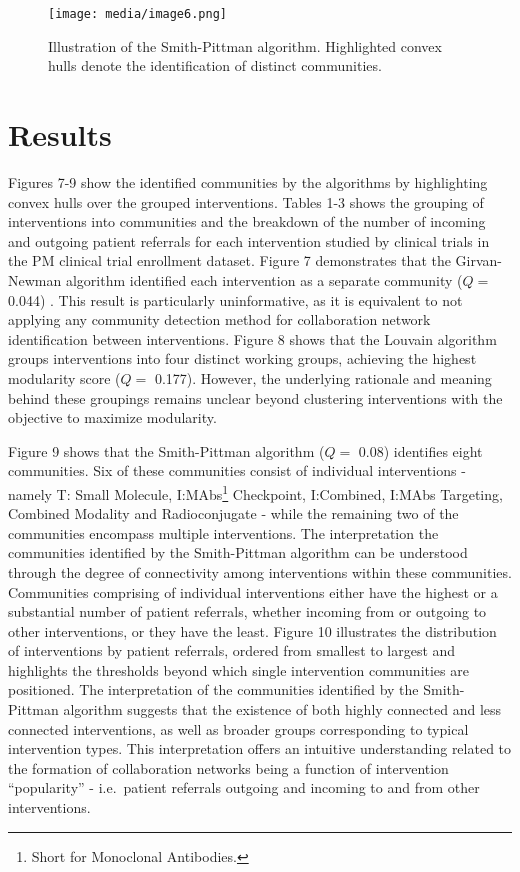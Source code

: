 \documentclass{article}
\begin{document}
\begin{figure}
\centering
\texttt{[image: media/image6.png]}
\caption{Illustration of the Smith-Pittman algorithm.
Highlighted convex hulls denote the identification of distinct
communities.}
\end{figure}

\section{Results}\label{results}

Figures 7-9 show the identified communities by the algorithms by
highlighting convex hulls over the grouped interventions. Tables 1-3
shows the grouping of interventions into communities and the breakdown
of the number of incoming and outgoing patient referrals for each
intervention studied by clinical trials in the PM clinical trial
enrollment dataset. Figure 7 demonstrates that the Girvan-Newman
algorithm identified each intervention as a separate community (\(Q =\)
0.044) . This result is particularly uninformative, as it is equivalent
to not applying any community detection method for collaboration network
identification between interventions. Figure 8 shows that the Louvain
algorithm groups interventions into four distinct working groups,
achieving the highest modularity score (\(Q =\) 0.177). However, the
underlying rationale and meaning behind these groupings remains unclear
beyond clustering interventions with the objective to maximize
modularity.

Figure 9 shows that the Smith-Pittman algorithm (\(Q =\) 0.08)
identifies eight communities. Six of these communities consist of
individual interventions - namely T: Small Molecule, I:MAbs\footnote{Short
  for Monoclonal Antibodies.} Checkpoint, I:Combined, I:MAbs Targeting,
Combined Modality and Radioconjugate - while the remaining two of the
communities encompass multiple interventions. The interpretation the
communities identified by the Smith-Pittman algorithm can be understood
through the degree of connectivity among interventions within these
communities. Communities comprising of individual interventions either
have the highest or a substantial number of patient referrals, whether
incoming from or outgoing to other interventions, or they have the
least. Figure 10 illustrates the distribution of interventions by
patient referrals, ordered from smallest to largest and highlights the
thresholds beyond which single intervention communities are positioned.
The interpretation of the communities identified by the Smith-Pittman
algorithm suggests that the existence of both highly connected and less
connected interventions, as well as broader groups corresponding to
typical intervention types. This interpretation offers an intuitive
understanding related to the formation of collaboration networks being a
function of intervention ``popularity'' - i.e.~patient referrals
outgoing and incoming to and from other interventions.
\end{document}
